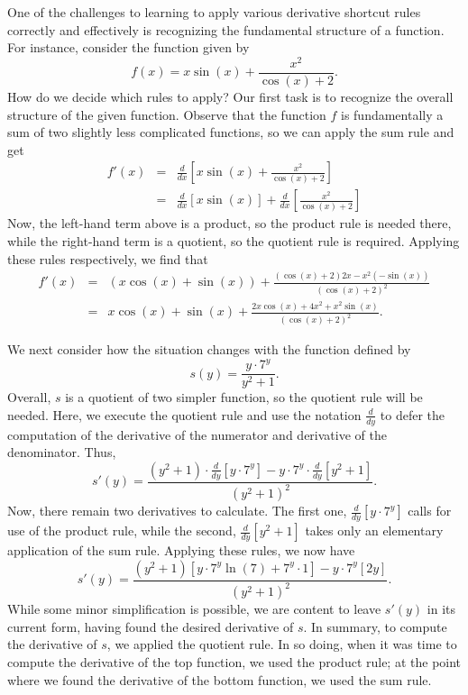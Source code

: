 One of the challenges to learning to apply various derivative shortcut rules correctly and effectively is recognizing the fundamental structure of a function.  For instance, consider the function given by
$$f(x) = x\sin(x) + \frac{x^2}{\cos(x) + 2}.$$
How do we decide which rules to apply?  Our first task is to recognize the overall structure of the given function.  Observe that the function $f$ is fundamentally a sum of two slightly less complicated functions, so we can apply the sum rule and get
\begin{eqnarray*}
f'(x) & = & \frac{d}{dx} \left[ x\sin(x) + \frac{x^2}{\cos(x) + 2} \right] \\
	& = & \frac{d}{dx} \left[ x\sin(x) \right] + \frac{d}{dx}\left[ \frac{x^2}{\cos(x) + 2} \right]  
\end{eqnarray*}
Now, the left-hand term above is a product, so the product rule is needed there, while the right-hand term is a quotient, so the quotient rule is required.  Applying these rules respectively, we find that
\begin{eqnarray*}
 f'(x) & = & \left( x \cos(x) + \sin(x) \right) + \frac{(\cos(x) + 2) 2x - x^2(-\sin(x))}{(\cos(x) + 2)^2} \\
        & = & x \cos(x) + \sin(x) + \frac{2x\cos(x) + 4x^2 + x^2\sin(x)}{(\cos(x) + 2)^2}.
\end{eqnarray*}

We next consider how the situation changes with the function defined by
$$s(y) = \frac{y \cdot 7^y}{y^2 + 1}.$$ 
Overall, $s$ is a quotient of two simpler function, so the quotient rule will be needed.  Here, we execute the quotient rule and use the notation $\frac{d}{dy}$ to defer the computation of the derivative of the numerator and derivative of the denominator.  Thus,
$$s'(y) = \frac{(y^2 + 1) \cdot \frac{d}{dy}\left[ y \cdot 7^y \right] - y \cdot 7^y \cdot \frac{d}{dy}\left[y^2 + 1 \right]}{(y^2 + 1)^2}.$$
Now, there remain two derivatives to calculate.  The first one, $\frac{d}{dy}\left[ y \cdot 7^y \right]$ calls for use of the product rule, while the second, $\frac{d}{dy}\left[y^2 + 1 \right]$ takes only an elementary application of the sum rule.  Applying these rules, we now have
$$s'(y) = \frac{(y^2 + 1) [y \cdot 7^y \ln(7) + 7^y \cdot 1] - y \cdot 7^y [2y]}{(y^2 + 1)^2}.$$
While some minor simplification is possible, we are content to leave $s'(y)$ in its current form, having found the desired derivative of $s$.  In summary, to compute the derivative of $s$, we applied the quotient rule.  In so doing, when it was time to compute the derivative of the top function, we used the product rule; at the point where we found the derivative of the bottom function, we used the sum rule.

